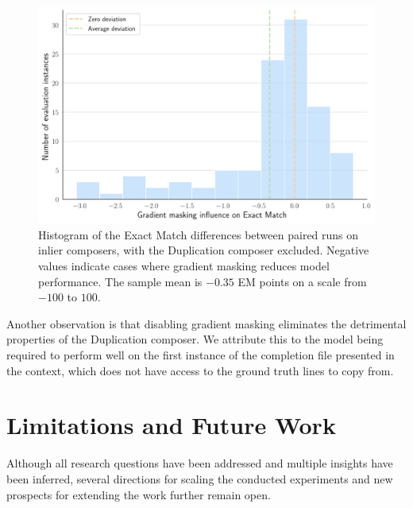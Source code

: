 \begin{figure}[ht]
    \centering
    \includegraphics[width=\textwidth]{figures/gradient-masking.pdf}
    \caption{Histogram of the Exact Match differences between paired runs on inlier composers, with the Duplication composer excluded. Negative values indicate cases where gradient masking reduces model performance. The sample mean is \(-0.35\) EM points on a scale from \(-100\) to \(100\).}\label{fig:gradient-masking}
\end{figure}

Another observation is that disabling gradient masking eliminates the detrimental properties of the Duplication composer. We attribute this to the model being required to perform well on the first instance of the completion file presented in the context, which does not have access to the ground truth lines to copy from.


\section{Limitations and Future Work}

Although all research questions have been addressed and multiple insights have been inferred, several directions for scaling the conducted experiments and new prospects for extending the work further remain open.

